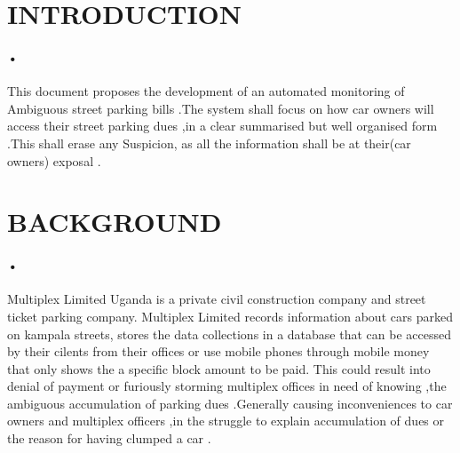 \documentclass[12pt]{article}
\begin{document}
\section{INTRODUCTION}
\paragraph{•}
This document proposes the development of an automated monitoring of Ambiguous street parking bills .The system shall focus on how car owners will access their street parking dues ,in a clear summarised but well organised form .This shall erase any Suspicion, as all the information shall be at their(car owners) exposal .
  
\section{BACKGROUND}
\paragraph{•}
Multiplex Limited Uganda is a private civil construction company and street ticket parking company. Multiplex Limited records information about cars parked on kampala streets, stores the data collections in a database that can be accessed by their cilents from their offices or use mobile phones through mobile money that only shows the a specific block amount to be paid. This could result into denial of payment or furiously storming multiplex offices in need of knowing ,the ambiguous accumulation of parking dues .Generally causing inconveniences to car owners and multiplex officers ,in the struggle to explain accumulation of dues or the reason for having clumped a car .
\end{document}
